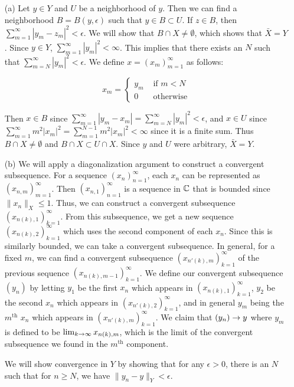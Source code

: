 \documentclass{hmwk}
\begin{document}
\begin{solution}
\begin{itemize}
    \item[(a)] Let $y \in Y$ and $U$ be a neighborhood of $y$. Then we can find a neighborhood $B = B(y, \epsilon)$ such that $y \in B \subset U$. If $z \in B$, then $\sum_{m=1}^\infty |y_m - z_m|^2 < \epsilon$. We will show that $B \cap X \neq \emptyset$, which shows that $\bar{X} = Y$. Since $y \in Y$, $\sum_{m=1}^\infty |y_m|^2 < \infty$. This implies that there exists an $N$ such that $\sum_{m=N}^\infty |y_m|^2 < \epsilon$. We define $x = (x_m)_{m=1}^\infty$ as follows:

    $$x_m = \begin{cases}
        y_m &\text{ if } m < N \\
        0 &\text{ otherwise}
    \end{cases}$$

    Then $x \in B$ since $\sum_{m=1}^\infty |y_m - x_m| = \sum_{m=N}^\infty |y_m|^2 < \epsilon$, and $x \in U$ since $\sum_{m=1}^\infty m^2|x_m|^2 = \sum_{m=1}^{N-1} m^2|x_m|^2 < \infty$ since it is a finite sum. Thus $B \cap X \neq \emptyset$ and $B \cap X \subset U \cap X$. Since $y$ and $U$ were arbitrary, $\bar{X} = Y$.

    \item[(b)] We will apply a diagonalization argument to construct a convergent subsequence. For a sequence $(x_n)_{n=1}^\infty$, each $x_n$ can be represented as $(x_{n,m})_{m=1}^\infty$. Then $(x_{n,1})_{n=1}^\infty$ is a sequence in $\mathbb{C}$ that is bounded since $\|x_n\|_X \leq 1$. Thus, we can construct a convergent subsequence $(x_{n(k), 1})_{k=1}^\infty$. From this subsequence, we get a new sequence $(x_{n(k),2})_{k=1}^\infty$ which uses the second component of each $x_n$. Since this is similarly bounded, we can take a convergent subsequence. In general, for a fixed $m$, we can find a convergent subsequence $(x_{n'(k),m})_{k=1}^\infty$ of the previous sequence $(x_{n(k),m-1})_{k=1}^\infty$. We define our convergent subsequence $(y_n)$ by letting $y_1$ be the first $x_n$ which appears in $(x_{n(k),1})_{k=1}^\infty$, $y_2$ be the second $x_n$ which appears in $(x_{n'(k),2})_{k=1}^\infty$, and in general $y_m$ being the $m^\text{th}$ $x_n$ which appears in $(x_{n'(k),m})_{k=1}^\infty$. We claim that $(y_n) \rightarrow y$ where $y_m$ is defined to be $\lim_{k\rightarrow \infty} x_{n(k), m}$, which is the limit of the convergent subsequence we found in the $m^\text{th}$ component. 

    We will show convergence in $Y$ by showing that for any $\epsilon > 0$, there is an $N$ such that for $n \geq N$, we have $\|y_{n} - y\|_Y < \epsilon$. 


\end{itemize}
\end{solution}
\end{document}
